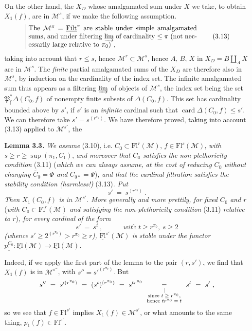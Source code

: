 \documentclass[11pt]{article}
\newcommand{\printedpage}[1]{\marginpar{\footnotesize p.~#1}}
\newcommand{\msp}[1]{\marginpar{\footnotesize [#1]}}
\newcommand{\M}{\mathcal{M}}
\newcommand{\Fl}{\mathrm{Fl}}
\newcommand{\uFl}{\underline{\mathrm{Fl}}}
\newcommand{\uFilt}{\underline{\mathrm{Filt}}}
\newcommand{\card}{\operatorname{card}}
\begin{document}
On the other hand, the $X_D$ whose amalgamated sum under $X$ we take, to obtain $X_1(f)$, are in $\M^s$, if we make the following assumption. \msp{page 25}
\[
\left|\ \parbox{0.72\linewidth}{The $\M^\pi=\uFilt^\pi$ are stable under simple amalgamated sums, and under filtering $\varinjlim$ of cardinality $\leq\pi$ (not necessarily large relative to $\pi_0$) ,}\right. \tag*{(3.13)}
\]
taking into account that $r\leq s$, hence $\M^r\subset\M^s$, hence $A$, $B$, $X$ in $X_D=B\amalg_A X$ are in $\M^s$. The \textit{finite} partial amalgamated sums of the $X_D$ are therefore also in $\M^s$, by induction on the cardinality of the index set. The infinite amalgamated sum thus appears as a filtering $\varinjlim$ of objects of $\M^s$, the index set being the set $\mathfrak{P}^*_{\mathfrak{f}}\Delta(C_0,f)$ of nonempty finite subsets of $\Delta(C_0,f)$. This set has cardinality bounded above by $s'$, if $s'$ is an \textit{infinite} cardinal such that $\card\Delta(C_0,f)\leq s'$. We can therefore take $s'=s^{(r^{\pi_0})}$. We have therefore proved, taking into account (3.13) applied to $\M^{s'}$, the %

\textbf{Lemma 3.3.} \textit{We assume} \textup{(3.10), i.e.} $C_0\subset\Fl^r(\M)$, $f\in\Fl^s(\M)$, \textit{with} $s\geq r\geq\sup(\pi_1,C_1)$, \textit{and moreover that $C_0$ satisfies the non-plethoricity condition} \textup{(3.11)} \textup{(}\textit{which we can always assume, at the cost of reducing $C_0$ without changing $\widetilde{C_0}=\Phi$ and $C_{0*}=\Psi$}\textup{)}\textit{, and that the cardinal filtration satisfies the stability condition (harmless!)} \textup{(3.13)}\textit{. Put}
\[
s'\ =\ s^{(r^{\pi_0})}\ . \tag*{(3.14)}
\]
\textit{Then $X_1(C_0,f)$ is in $\M^{s'}$. More generally and more prettily, for fixed $C_0$ and $r$} \textup{(}\textit{with $C_0\subset\Fl^r(\M)$ and satisfying the non-plethoricity condition} \textup{(3.11)} \textit{relative to $r$}\textup{)}\textit{, for every cardinal} \msp{page 26} \textit{of the form}
\[
s'\ =\ s^t\ ,\qquad\quad\textit{with}\ t\geq r^{\pi_0},\ s\geq 2 \tag*{(3.15)}
\]
\textit{(whence $s'\geq 2^{(r^{\pi_0})}>r^{\pi_0}\geq r$), $\uFl^{s'}(\M)$ is stable under the functor $p_1^{C_0}:\uFl(\M)\longrightarrow\uFl(\M)$.}

Indeed, if we apply the first part of the lemma to the pair $(r,s')$, we find that $X_1(f)$ is in $\M^{s''}$, with $s''=s'^{(r^{\pi_0})}$. But
\[
s''\ =\ s'^{(r^{\pi_0})}\ =\ (s^t)^{(r^{\pi_0})}\ =\ s^{tr^{\pi_0}}\ \underset{\substack{\vert\\ \text{\scriptsize since $t\geq r^{\pi_0}$,}\\ \text{\scriptsize hence $tr^{\pi_0}=t$}}}{=}\ s^t\ =\ s'\ ,
\]
\printedpage{18}
so we see that $f\in\Fl^{s'}$ implies $X_1(f)\in\M^{s'}$, or what amounts to the same thing, $p_1(f)\in\Fl^{s'}$.
\end{document}
